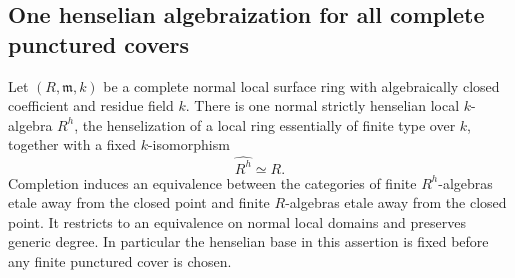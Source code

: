 \subsection{One henselian algebraization for all complete punctured covers}

\begin{lemma}
\label{D:fixed-henselian-algebraization}
Let $(R,\mathfrak m,k)$ be a complete normal local surface ring
with algebraically closed coefficient and residue field $k$.
There is one normal strictly henselian local $k$-algebra $R^h$,
the henselization of a local ring essentially of finite type over
$k$, together with a fixed $k$-isomorphism
\[
                         \widehat {R^h}\simeq R.        \tag{D.AC.1}
\]
Completion induces an equivalence between the categories of finite
$R^h$-algebras etale away from the closed point and finite
$R$-algebras etale away from the closed point. It restricts to an
equivalence on normal local domains and preserves generic degree.
In particular the henselian base in this assertion is fixed before
any finite punctured cover is chosen.
\end{lemma}

